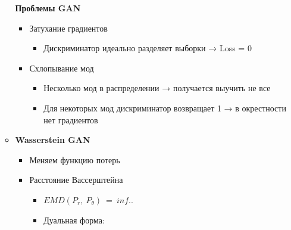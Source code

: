 \documentclass[a4paper, 12pt]{article}
\begin{document}
\begin{itemize}
\begin{itemize}
    \textbf{Проблемы GAN}
    

    \begin{itemize}
    \item
      
      Затухание градиентов
      
      \begin{itemize}
      \item
        
        Дискриминатор идеально разделяет выборки → Loss = 0
        
      \end{itemize}
    \item
      
      Схлопывание мод
      

      \begin{itemize}
      \item
        
        Несколько мод в распределении → получается выучить не все
        
      \item
        
        Для некоторых мод дискриминатор возвращает 1 → в окрестности нет
        градиентов
        
      \end{itemize}
    \end{itemize}
  \item
    
    \textbf{Wasserstein GAN}
    

    \begin{itemize}
    \item
      
      Меняем функцию потерь
      
    \item
      
      {Расстояние Вассерштейна}
      

      \begin{itemize}
      \item
        
        \(EMD(P_{r},\ P_{\theta})\  = \ inf\)..
        
      \item
        
        Дуальная форма: 
        

\end{itemize}
\end{itemize}
\end{itemize}
\end{itemize}
\end{document}
